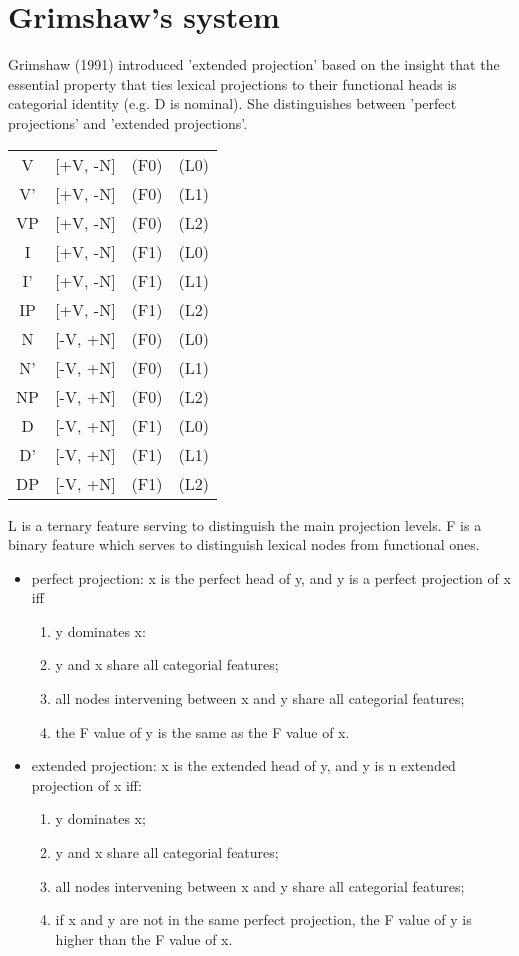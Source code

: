 \documentclass{article}
\begin{document}
\section{Grimshaw's system}
Grimshaw (1991) introduced 'extended projection' based on the insight that the essential property that ties lexical projections to their functional heads is categorial identity (e.g. D is nominal). She distinguishes between 'perfect projections' and 'extended projections'.


\begin{example}
\label{sec: Grimshaw's system}
\begin{tabular} [t] {|c|c|c|c|}

\hline
V & [+V, -N] & (F0) & (L0)\\
V' & [+V, -N] & (F0) & (L1)\\
VP & [+V, -N] & (F0) & (L2)\\
\hline
I & [+V, -N] & (F1) & (L0)\\
I' & [+V, -N] & (F1) & (L1)\\
IP & [+V, -N] & (F1) & (L2)\\
\hline
N & [-V, +N] & (F0) & (L0)\\
N' & [-V, +N] & (F0) & (L1)\\
NP & [-V, +N] & (F0) & (L2)\\
\hline
D & [-V, +N] & (F1) & (L0)\\
D' & [-V, +N] & (F1) & (L1)\\
DP & [-V, +N] & (F1) & (L2)\\
\hline
\end{tabular}
L is a ternary feature serving to distinguish the main projection levels. F is a binary feature which serves to distinguish lexical nodes from functional ones.

\end{example}

\begin{itemize}
\item perfect projection: 
x is the perfect head of y, and y is a perfect projection of x iff
\begin{enumerate}
\item y dominates x:
\item y and x share all categorial features;
\item all nodes intervening between x and y share all categorial features;
\item the F value of y is the same as the F value of x.
\end{enumerate}


\item extended projection: 
x is the extended head of y, and y is n extended projection of x iff:
\begin{enumerate}
\item y dominates x;
\item y and x share all categorial features;
\item all nodes intervening between x and y share all categorial features;
\item if x and y are not in the same perfect projection, the F value of y is higher than the F value of x.
\end{enumerate}
\end{itemize}
\end{document}
